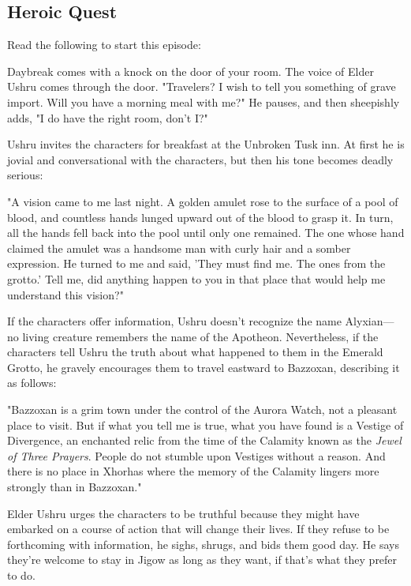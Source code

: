 \documentclass[10pt,a4,twoside,twocolumn,openany,nodeprecatedcode]{dndbook}
\begin{document}
\subsection{Heroic Quest}
Read the following to start this episode:
\begin{DndReadAloud}{}
Daybreak comes with a knock on the door of your room. The voice of Elder Ushru comes through the door. "Travelers? I wish to tell you something of grave import. Will you have a morning meal with me?" He pauses, and then sheepishly adds, "I do have the right room, don't I?"
\end{DndReadAloud}

Ushru invites the characters for breakfast at the Unbroken Tusk inn. At first he is jovial and conversational with the characters, but then his tone becomes deadly serious:
\begin{DndReadAloud}{}
"A vision came to me last night. A golden amulet rose to the surface of a pool of blood, and countless hands lunged upward out of the blood to grasp it. In turn, all the hands fell back into the pool until only one remained. The one whose hand claimed the amulet was a handsome man with curly hair and a somber expression. He turned to me and said, 'They must find me. The ones from the grotto.' Tell me, did anything happen to you in that place that would help me understand this vision?"
\end{DndReadAloud}

If the characters offer information, Ushru doesn't recognize the name Alyxian—no living creature remembers the name of the Apotheon. Nevertheless, if the characters tell Ushru the truth about what happened to them in the Emerald Grotto, he gravely encourages them to travel eastward to Bazzoxan, describing it as follows:
\begin{DndReadAloud}{}
"Bazzoxan is a grim town under the control of the Aurora Watch, not a pleasant place to visit. But if what you tell me is true, what you have found is a Vestige of Divergence, an enchanted relic from the time of the Calamity known as the \textit{Jewel of Three Prayers}. People do not stumble upon Vestiges without a reason. And there is no place in Xhorhas where the memory of the Calamity lingers more strongly than in Bazzoxan."
\end{DndReadAloud}

Elder Ushru urges the characters to be truthful because they might have embarked on a course of action that will change their lives. If they refuse to be forthcoming with information, he sighs, shrugs, and bids them good day. He says they're welcome to stay in Jigow as long as they want, if that's what they prefer to do.
\end{document}
